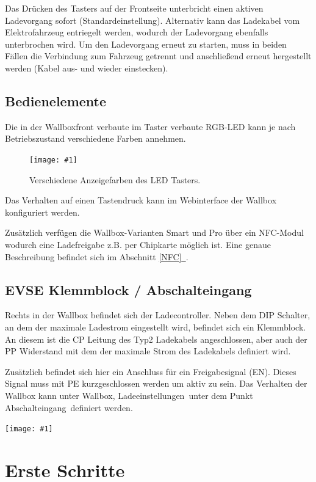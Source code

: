 \documentclass[a4paper,10pt]{article}
\newcommand{\gfx}[1]{\texttt{[image: \#1]}}
\newcommand*{\fullref}[1]{Abschnitt \hyperref[{#1}]{\ref*{#1}~\nameref*{#1}}}
\begin{document}
\begin{multicols*}{2}
	Das Drücken des Tasters auf der Frontseite unterbricht einen 
	aktiven Ladevorgang sofort (Standardeinstellung). Alternativ kann das Ladekabel vom Elektrofahrzeug entriegelt werden,
    wodurch der Ladevorgang ebenfalls unterbrochen wird. Um den Ladevorgang erneut
    zu starten, muss in beiden Fällen die Verbindung zum Fahrzeug getrennt und
    anschließend erneut hergestellt werden (Kabel aus- und wieder einstecken).


    \subsection{Bedienelemente}\label{lockswitch}
	Die in der Wallboxfront verbaute im Taster verbaute RGB-LED kann je nach Betriebszustand
	verschiedene Farben annehmen. 
    \begin{figure}[H]
    	\gfx{./img_warp3/resized/led_button.jpg} 
        \caption*{Verschiedene Anzeigefarben des LED Tasters.}
    \end{figure}

	Das Verhalten auf einen Tastendruck kann im Webinterface der Wallbox
	konfiguriert werden.

    Zusätzlich verfügen die Wallbox-Varianten Smart und Pro über ein NFC-Modul
	wodurch eine Ladefreigabe z.B. per Chipkarte möglich ist. Eine
    genaue Beschreibung befindet sich im \fullref{NFC}.

	\subsection{EVSE Klemmblock / Abschalteingang}
	Rechts in der Wallbox befindet sich der Ladecontroller. Neben dem DIP
	Schalter, an dem der maximale Ladestrom eingestellt wird, befindet sich ein
	Klemmblock. An diesem ist die CP Leitung des Typ2 Ladekabels angeschlossen,
	aber auch der PP Widerstand mit dem der maximale Strom des Ladekabels
	definiert wird.
	\par
	Zusätzlich befindet sich hier ein Anschluss für ein Freigabesignal (\glqq EN\grqq).
	Dieses Signal muss mit PE kurzgeschlossen werden um aktiv zu sein. Das
	Verhalten der Wallbox kann unter \glqq Wallbox\grqq, \glqq
	Ladeeinstellungen\grqq~unter dem Punkt \glqq Abschalteingang\grqq~definiert
	werden.

    \gfx{./img_warp3/resized/evse_clamp.jpg} 

    \newpage
    \section{Erste Schritte}\label{setup}


\end{multicols*}
\end{document}
